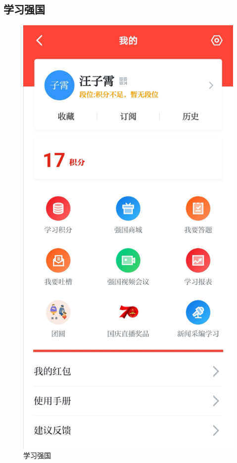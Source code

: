 \documentclass{article}
\begin{document}
\subsection{学习强国}
\begin{figure}[h!]
			  \centering
			  \includegraphics[scale=0.11]{Study_builcounty}
			  \caption{学习强国}
			  \label{fig:Study_builcounty}
		  \end{figure}
\end{document}
